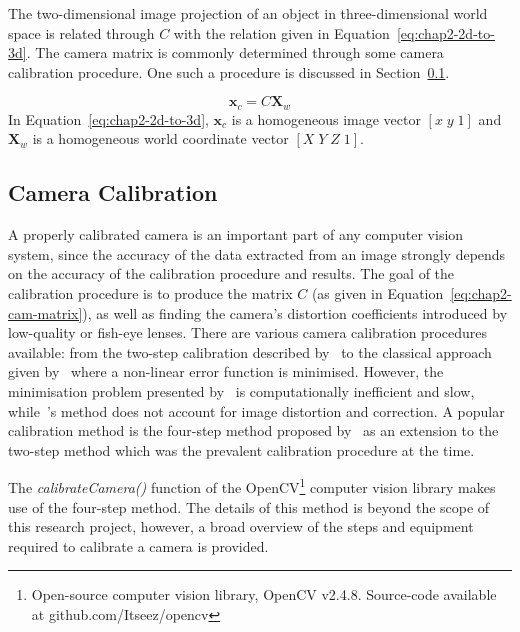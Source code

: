 The two-dimensional image projection of an object in three-dimensional world space is related through $C$ with the relation given in Equation~\ref{eq:chap2-2d-to-3d}. The camera matrix is commonly determined through some camera calibration procedure. One such a procedure is discussed in Section~\ref{sec:chap2-cam-calibration}.

\begin{equation}
  \label{eq:chap2-2d-to-3d}
  \bm{x}_c
  = C
  \bm{X}_w
\end{equation}
In Equation~\ref{eq:chap2-2d-to-3d}, $\bm{x}_c$ is a homogeneous image vector $[x\;y\;1]$ and $\bm{X}_w$ is a homogeneous world coordinate vector $[X\;Y\;Z\;1]$. 

\subsection{Camera Calibration}
\label{sec:chap2-cam-calibration}

A properly calibrated camera is an important part of any computer vision system, since the accuracy of the data extracted from an image strongly depends on the accuracy of the calibration procedure and results. The goal of the calibration procedure is to produce the matrix $C$ (as given in Equation~\ref{eq:chap2-cam-matrix}), as well as finding the camera's distortion coefficients introduced by low-quality or fish-eye lenses. There are various camera calibration procedures available: from the two-step calibration described by~\cite{melen1994geometrical} to the classical approach given by~\cite{slama1980manual} where a non-linear error function is minimised. However, the minimisation problem presented by~\citeauthor{slama1980manual} is computationally inefficient and slow, while~\citeauthor{melen1994geometrical}'s method does not account for image distortion and correction. A popular calibration method is the four-step method proposed by~\cite{heikkila1997four} as an extension to the two-step method which was the prevalent calibration procedure at the time.

The \emph{calibrateCamera()} function of the OpenCV\footnote{Open-source computer vision library, OpenCV v2.4.8. Source-code available at github.com/Itseez/opencv} computer vision library \citep{bradski2000opencv} makes use of the four-step method. The details of this method is beyond the scope of this research project, however, a broad overview of the steps and equipment required to calibrate a camera is provided. 

